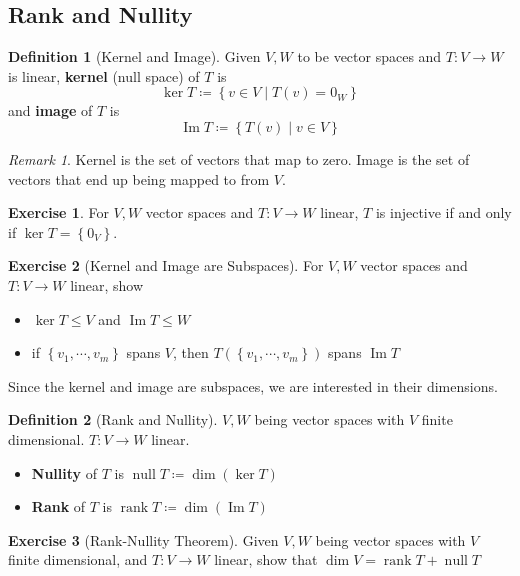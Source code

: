 \documentclass[12pt, a4paper]{article}
\DeclareMathOperator{\im}{Im}
\DeclareMathOperator{\Null}{null}
\DeclareMathOperator{\Rank}{rank}
\theoremstyle{remark}
\newtheorem{remark}{Remark}
\theoremstyle{definition}
\newtheorem{definition}{Definition}
\newtheorem{exercise}{Exercise}
\numberwithin{equation}{section}
\numberwithin{definition}{section}
\numberwithin{example}{section}
\numberwithin{exercise}{section}
\numberwithin{remark}{section}
\numberwithin{figure}{section}
\begin{document}
\subsection{Rank and Nullity}
\begin{definition}[Kernel and Image]
    Given $V, W$ to be vector spaces and $T:V \rightarrow W$ is linear,
    \textbf{kernel} (null space) of $T$ is
    \begin{equation*}
        \ker T \coloneqq \left\{ v \in V \middle| T(v) = 0_W \right\}
    \end{equation*}
    and \textbf{image} of $T$ is
    \begin{equation*}
        \im T \coloneqq \left\{ T(v) \middle| v \in V \right\}
    \end{equation*}
\end{definition}
\begin{remark}
    Kernel is the set of vectors that map to zero.
    Image is the set of vectors that end up being mapped to from $V$.
\end{remark}
\begin{exercise}
    For $V, W$ vector spaces and $T:V \rightarrow W$ linear,
    $T$ is injective if and only if $\ker T = \left\{ 0_V \right\}$.
\end{exercise}
\begin{exercise}[Kernel and Image are Subspaces]
    For $V, W$ vector spaces and $T:V \rightarrow W$ linear, show
    \begin{itemize}
        \item $\ker T \leq V$ and $\im T \leq W$
        \item if $\left\{ v_1, \cdots, v_m \right\}$ spans $V$, then $T(\left\{ v_1, \cdots, v_m \right\})$ spans $\im T$
    \end{itemize}
\end{exercise}
Since the kernel and image are subspaces, we are interested in their dimensions.
\begin{definition}[Rank and Nullity]
    $V, W$ being vector spaces with $V$ finite dimensional.
    $T: V \rightarrow W$ linear.
    \begin{itemize}
        \item \textbf{Nullity} of $T$ is $\Null T \coloneqq \dim \left( \ker T \right)$
        \item \textbf{Rank} of $T$ is $\Rank T \coloneqq \dim \left( \im T \right)$
    \end{itemize}
\end{definition}
\begin{exercise}[Rank-Nullity Theorem]
    Given $V, W$ being vector spaces with $V$ finite dimensional, and
    $T: V \rightarrow W$ linear,
    show that $\dim V = \Rank T + \Null T$
\end{exercise}
\end{document}
